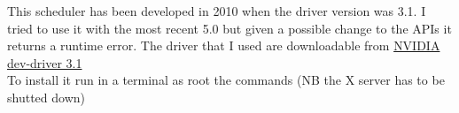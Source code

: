 \documentclass[a4paper,13pt]{article}
\begin{document}
\begin{multicols}{2}
    This scheduler has been developed in 2010 when the driver version was 3.1. I tried to use it with the most recent 5.0 but given a possible change to the APIs it returns a runtime error.
    The driver that I used are downloadable from \href{https://mega.co.nz/#!g49wnBaR!eVaf8DeGmDyPUV8VoJMtHRAHXDE4_-EWxwrmL6LCHWY}{NVIDIA dev-driver 3.1}\\
    To install it run in a terminal as root the commands (NB the X server has to be shutted down)
  \lstset{
      basicstyle=\ttfamily\footnotesize,
          breaklines=true,
          tabsize=2,
          showspaces=false,
          showstringspaces=false,
          framexleftmargin=5pt,
          framexrightmargin=5pt,
          framexbottommargin=5pt,
          framextopmargin=5pt,
  }
   

\end{multicols}
\end{document}
